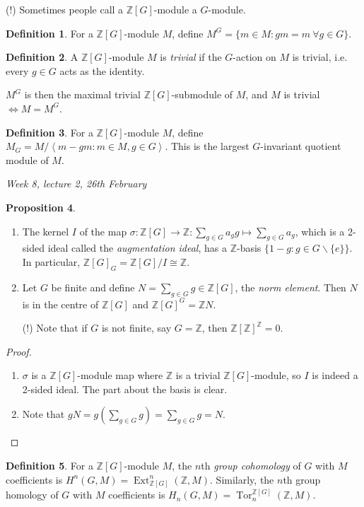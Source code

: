 \documentclass{article}
\newcommand{\la}{\left\langle}
\newcommand{\ra}{\right\rangle}
\newcommand{\Z}{\mathbb{Z}}
\newcommand{\Tor}{\operatorname{Tor}}
\newcommand{\Ext}{\operatorname{Ext}}
\theoremstyle{definition}
\newtheorem{defn}{Definition}[subsection]
\newtheorem{prop}[defn]{Proposition}
\begin{document}
(!) Sometimes people call a $\Z[G]$-module a $G$-module.

\begin{defn}
For a $\Z[G]$-module $M$, define $M^G=\{m\in M:gm=m \ \forall g\in G\}$.
\end{defn}

\begin{defn}
A $\Z[G]$-module $M$ is \textit{trivial} if the $G$-action on $M$ is trivial, i.e. every $g\in G$ acts as the identity.

$M^G$ is then the maximal trivial $\Z[G]$-submodule of $M$, and $M$ is trivial $\iff M=M^G$.
\end{defn}

\begin{defn}
For a $\Z[G]$-module $M$, define $M_G=M/\la m-gm:m\in M,g\in G\ra$. This is the largest $G$-invariant quotient module of $M$.
\end{defn}

\begin{flushright}
\textit{Week 8, lecture 2, 26th February}
\end{flushright}

\begin{prop}
\begin{enumerate}
\item The kernel $I$ of the map $\sigma:\Z[G]\rightarrow\Z:\sum_{g\in G}a_gg\mapsto \sum_{g\in G}a_g$, which is a 2-sided ideal called the \textit{augmentation ideal}, has a $\Z$-basis $\{1-g:g\in G\backslash\{e\}\}$. In particular, $\Z[G]_G=\Z[G]/I\cong\Z$.
\item Let $G$ be finite and define $N=\sum_{g\in G}g\in\Z[G]$, the \textit{norm element}. Then $N$ is in the centre of $\Z[G]$ and $\Z[G]^G=\Z N$.

(!) Note that if $G$ is not finite, say $G=\Z$, then $\Z[\Z]^\Z=0$.
\end{enumerate}
\end{prop}
\begin{proof}
\begin{enumerate}
\item $\sigma$ is a $\Z[G]$-module map where $\Z$ is a trivial $\Z[G]$-module, so $I$ is indeed a 2-sided ideal. The part about the basis is clear.
\item Note that $gN=g\left(\sum_{g\in G}g\right)=\sum_{g\in G}g=N$.
\end{enumerate}
\end{proof}

\begin{defn}
For a $\Z[G]$-module $M$, the $n$th \textit{group cohomology} of $G$ with $M$ coefficients is $H^n(G,M)=\Ext_{\Z[G]}^n(\Z,M)$. Similarly, the $n$th group homology of $G$ with $M$ coefficients is $H_n(G,M)=\Tor_n^{\Z[G]}(\Z,M)$.
\end{defn}
\end{document}
